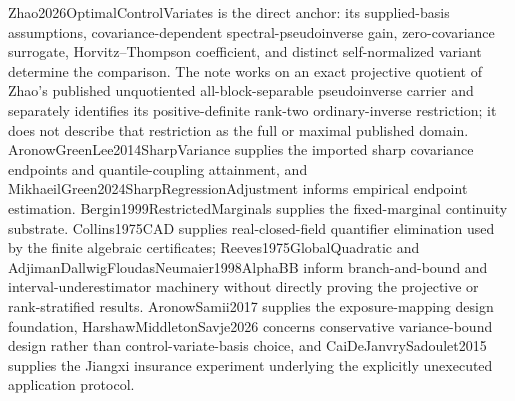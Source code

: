 Zhao2026OptimalControlVariates is the direct anchor: its supplied-basis assumptions, covariance-dependent spectral-pseudoinverse gain, zero-covariance surrogate, Horvitz--Thompson coefficient, and distinct self-normalized variant determine the comparison.  The note works on an exact projective quotient of Zhao's published unquotiented all-block-separable pseudoinverse carrier and separately identifies its positive-definite rank-two ordinary-inverse restriction; it does not describe that restriction as the full or maximal published domain.  AronowGreenLee2014SharpVariance supplies the imported sharp covariance endpoints and quantile-coupling attainment, and MikhaeilGreen2024SharpRegressionAdjustment informs empirical endpoint estimation.  Bergin1999RestrictedMarginals supplies the fixed-marginal continuity substrate.  Collins1975CAD supplies real-closed-field quantifier elimination used by the finite algebraic certificates; Reeves1975GlobalQuadratic and AdjimanDallwigFloudasNeumaier1998AlphaBB inform branch-and-bound and interval-underestimator machinery without directly proving the projective or rank-stratified results.  AronowSamii2017 supplies the exposure-mapping design foundation, HarshawMiddletonSavje2026 concerns conservative variance-bound design rather than control-variate-basis choice, and CaiDeJanvrySadoulet2015 supplies the Jiangxi insurance experiment underlying the explicitly unexecuted application protocol.